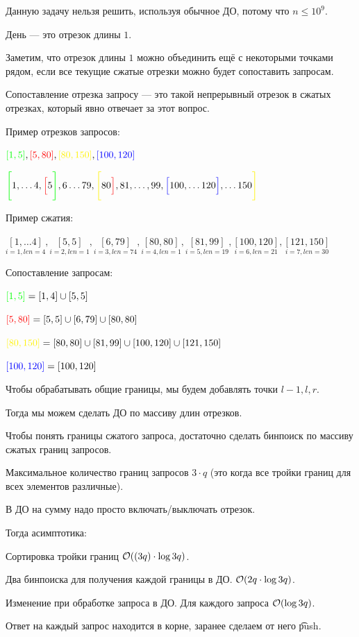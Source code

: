 Данную задачу нельзя решить, используя обычное ДО, потому что $n \le 10^9$.

День --- это отрезок длины $1$.

Заметим, что отрезок длины $1$ можно объединить ещё с некоторыми точками рядом, если все текущие сжатые отрезки можно будет сопоставить запросам.

Сопоставление отрезка запросу --- это такой непрерывный отрезок в сжатых отрезках, который явно отвечает за этот вопрос.
\down

Пример отрезков запросов:

$\green{[1, 5]}, \red{[5, 80]}, \yellow{[80, 150]}, \blue{[100, 120]}$

$\green{\Bigg[} 1, \ldots 4, \red{\Big[} 5 \green{\Bigg]}, 6 \ldots 79, \yellow{\Bigg[}80 \red{\Big]}, 81, \ldots, 99, \blue{\Big[}100, \ldots 120 \blue{\Big]}, \ldots 150 \yellow{\Bigg]}$
\down

Пример сжатия:

$\underset{i=1, len = 4}{[1, \ldots 4]}, \underset{i=2, len=1}{[5, 5]}, \underset{i=3, len=74}{[6, 79]}, \underset{i=4, len=1}{[80, 80]}, \underset{i=5, len=19}{[81, 99]}, \underset{i=6, len=21}{[100, 120]}, \underset{i=7, len=30}{[121, 150]}$
\down

Сопоставление запросам:

${\color{green}{[1, 5]}} = [1, 4] \cup [5, 5]$

${\color{red}{[5, 80]}} = [5, 5] \cup [6, 79] \cup [80, 80]$

$\yellow{[80, 150]} = [80, 80] \cup [81, 99] \cup [100, 120] \cup [121, 150]$

${\color{blue}{[100, 120]}} = [100, 120]$
\down


Чтобы обрабатывать общие границы, мы будем добавлять точки $l-1,l,r$.

Тогда мы можем сделать ДО по массиву длин отрезков.

Чтобы понять границы сжатого запроса, достаточно сделать бинпоиск по массиву сжатых границ запросов.

Максимальное количество границ запросов $3 \cdot q$ (это когда все тройки границ для всех элементов различные).

В ДО на сумму надо просто включать/выключать отрезок.

Тогда асимптотика:

\up \up
\begin{MyList}[0pt]
	\item Сортировка тройки границ $\mathcal{O}((3q) \cdot \log 3q)$.
	
	\item Два бинпоиска для получения каждой границы в ДО. $\mathcal{O}(2q \cdot \log 3q)$.
	
	\item Изменение при обработке запроса в ДО. Для каждого запроса $\mathcal{O}(\log 3q)$.
	
	\item Ответ на каждый запрос находится в корне, заранее сделаем от него \t{push}.
\end{MyList}

